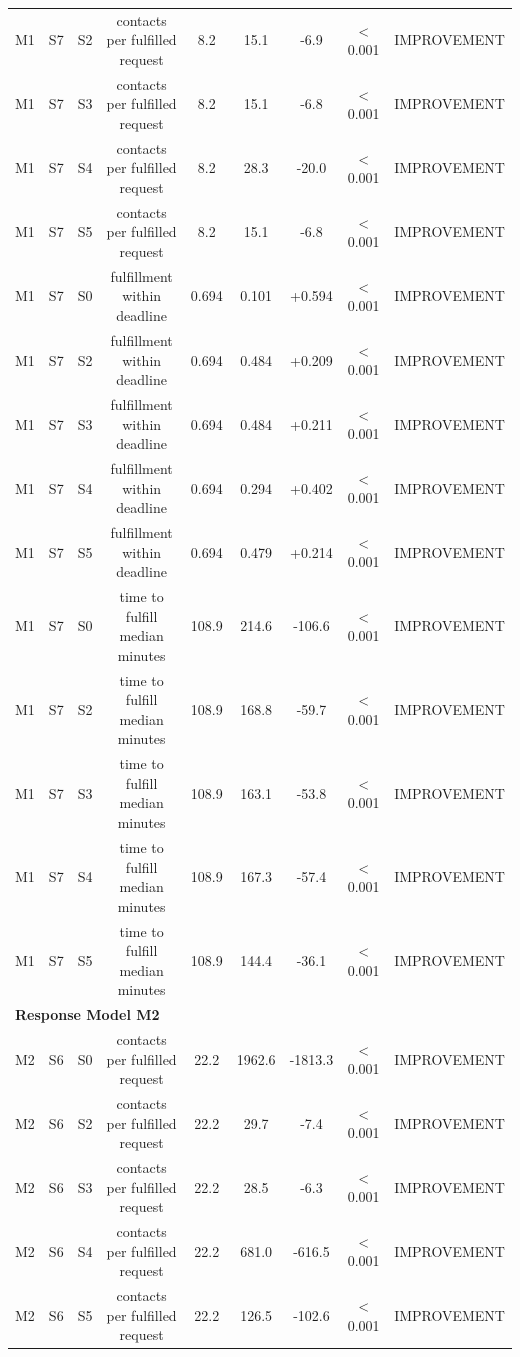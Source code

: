 \begin{table}[t]
\begin{tabular}{lllcccccl}
M1 & S7 & S2 & contacts per fulfilled request & 8.2 & 15.1 & -6.9 & < 0.001 & IMPROVEMENT \\
M1 & S7 & S3 & contacts per fulfilled request & 8.2 & 15.1 & -6.8 & < 0.001 & IMPROVEMENT \\
M1 & S7 & S4 & contacts per fulfilled request & 8.2 & 28.3 & -20.0 & < 0.001 & IMPROVEMENT \\
M1 & S7 & S5 & contacts per fulfilled request & 8.2 & 15.1 & -6.8 & < 0.001 & IMPROVEMENT \\
M1 & S7 & S0 & fulfillment within deadline & 0.694 & 0.101 & +0.594 & < 0.001 & IMPROVEMENT \\
M1 & S7 & S2 & fulfillment within deadline & 0.694 & 0.484 & +0.209 & < 0.001 & IMPROVEMENT \\
M1 & S7 & S3 & fulfillment within deadline & 0.694 & 0.484 & +0.211 & < 0.001 & IMPROVEMENT \\
M1 & S7 & S4 & fulfillment within deadline & 0.694 & 0.294 & +0.402 & < 0.001 & IMPROVEMENT \\
M1 & S7 & S5 & fulfillment within deadline & 0.694 & 0.479 & +0.214 & < 0.001 & IMPROVEMENT \\
M1 & S7 & S0 & time to fulfill median minutes & 108.9 & 214.6 & -106.6 & < 0.001 & IMPROVEMENT \\
M1 & S7 & S2 & time to fulfill median minutes & 108.9 & 168.8 & -59.7 & < 0.001 & IMPROVEMENT \\
M1 & S7 & S3 & time to fulfill median minutes & 108.9 & 163.1 & -53.8 & < 0.001 & IMPROVEMENT \\
M1 & S7 & S4 & time to fulfill median minutes & 108.9 & 167.3 & -57.4 & < 0.001 & IMPROVEMENT \\
M1 & S7 & S5 & time to fulfill median minutes & 108.9 & 144.4 & -36.1 & < 0.001 & IMPROVEMENT \\
\midrule
\multicolumn{9}{l}{\textbf{Response Model M2}} \\
\midrule
M2 & S6 & S0 & contacts per fulfilled request & 22.2 & 1962.6 & -1813.3 & < 0.001 & IMPROVEMENT \\
M2 & S6 & S2 & contacts per fulfilled request & 22.2 & 29.7 & -7.4 & < 0.001 & IMPROVEMENT \\
M2 & S6 & S3 & contacts per fulfilled request & 22.2 & 28.5 & -6.3 & < 0.001 & IMPROVEMENT \\
M2 & S6 & S4 & contacts per fulfilled request & 22.2 & 681.0 & -616.5 & < 0.001 & IMPROVEMENT \\
M2 & S6 & S5 & contacts per fulfilled request & 22.2 & 126.5 & -102.6 & < 0.001 & IMPROVEMENT \\

\end{tabular}
\end{table}
